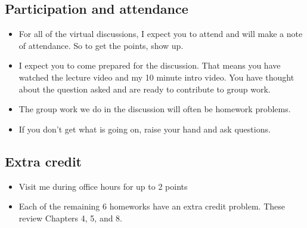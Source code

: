 \documentclass[11pt]{article}
\begin{document}
\subsection*{Participation and attendance}
\begin{itemize}
	\item For all of the virtual discussions, I expect you to attend and will make a note of attendance. So to get the points, show up.
	\item I expect you to come prepared for the discussion. That means you have watched the lecture video and my 10 minute intro video. You have thought about the question asked and are ready to contribute to group work.
	\item The group work we do in the discussion will often be homework problems.
	\item If you don't get what is going on, raise your hand and ask questions.
\end{itemize}
 
\subsection*{Extra credit}
\begin{itemize}
	\item Visit me during office hours for up to 2 points
	\item Each of the remaining 6 homeworks have an extra credit problem. These review Chapters 4, 5, and 8.
\end{itemize}



\cleardoublepage
\end{document}
